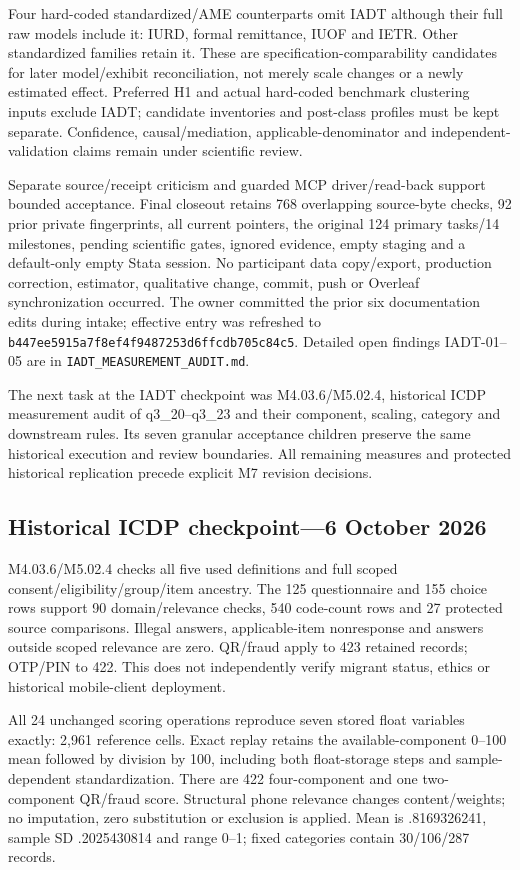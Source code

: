 \documentclass[11pt,a4paper]{article}
\begin{document}
Four hard-coded standardized/AME counterparts omit IADT although their full
raw models include it: IURD, formal remittance, IUOF and IETR. Other
standardized families retain it. These are specification-comparability
candidates for later model/exhibit reconciliation, not merely scale changes
or a newly estimated effect. Preferred H1 and actual hard-coded benchmark
clustering inputs exclude IADT; candidate inventories and post-class profiles
must be kept separate. Confidence, causal/mediation, applicable-denominator
and independent-validation claims remain under scientific review.

Separate source/receipt criticism and guarded MCP driver/read-back support
bounded acceptance. Final closeout retains 768 overlapping source-byte
checks, 92 prior private fingerprints, all current pointers, the original
124 primary tasks/14 milestones, pending scientific gates, ignored evidence,
empty staging and a default-only empty Stata session. No participant data
copy/export, production correction, estimator, qualitative change, commit,
push or Overleaf synchronization occurred. The owner committed the prior
six documentation edits during intake; effective entry was refreshed to
\texttt{b447ee5915a7f8ef4f9487253d6ffcdb705c84c5}. Detailed open findings
IADT-01--05 are in \texttt{IADT\_MEASUREMENT\_AUDIT.md}.

The next task at the IADT checkpoint was M4.03.6/M5.02.4, historical ICDP measurement
audit of q3\_20--q3\_23 and their component, scaling, category and downstream
rules. Its seven granular acceptance children preserve the same historical
execution and review boundaries. All remaining measures and protected
historical replication precede explicit M7 revision decisions.

\subsection{Historical ICDP checkpoint---6 October 2026}
M4.03.6/M5.02.4 checks all five used definitions and full scoped
consent/eligibility/group/item ancestry. The 125 questionnaire and 155
choice rows support 90 domain/relevance checks, 540 code-count rows and
27 protected source comparisons. Illegal answers, applicable-item
nonresponse and answers outside scoped relevance are zero. QR/fraud
apply to 423 retained records; OTP/PIN to 422. This does not independently
verify migrant status, ethics or historical mobile-client deployment.

All 24 unchanged scoring operations reproduce seven stored float variables
exactly: 2,961 reference cells. Exact replay retains the available-component
0--100 mean followed by division by 100, including both float-storage
steps and sample-dependent standardization. There are 422 four-component
and one two-component QR/fraud score. Structural phone relevance changes
content/weights; no imputation, zero substitution or exclusion is applied.
Mean is .8169326241, sample SD .2025430814 and range 0--1; fixed categories
contain 30/106/287 records.
\end{document}
